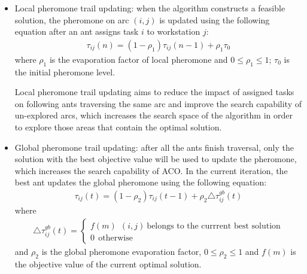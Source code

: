 \begin{itemize}
	\item Local pheromone trail updating: when the algorithm constructs a feasible solution, the pheromone on arc $(i,j)$ is updated using the following equation after an ant assigns task $i$ to workstation $j$:
	\begin{align}
		\tau_{ij}(n) = (1- \rho_1)\tau_{ij} (n-1) + \rho_1 \tau_0 \label{formula9}
	\end{align}
	where $\rho_1$ is the evaporation factor of local pheromone and $0 \leq \rho_1 \leq 1$; $\tau_0$ is the initial pheromone level.
	
	Local pheromone trail updating aims to reduce the impact of assigned tasks on following ants traversing the same arc and improve the search capability of un-explored arcs, which increases the search space of the algorithm in order to explore those areas that contain the optimal solution. 

	\item Global pheromone trail updating: after all the ants finish traversal, only the solution with the best objective value will be used to update the pheromone, which increases the search capability of ACO. In the current iteration, the best ant updates the global pheromone using the following equation:
	\begin{align}
		\tau_{ij}(t) = (1 - \rho_2) \tau_{ij} (t - 1) + \rho_2 \triangle \tau_{ij}^{gb} (t) \label{formula10}
	\end{align}
	where 
	\begin{align}
		\triangle \tau_{ij}^{gb} (t) = \begin{cases}
		f(m) \ \ (i, j) \  \text{belongs to the currrent best solution} \\
		0 \ \ \text{otherwise}
		\end{cases}
	\end{align}
	and $\rho_2$ is the global pheromone evaporation factor, $0 \leq \rho_2 \leq 1$ and $f(m)$ is the objective value of the current optimal solution.
\end{itemize}

